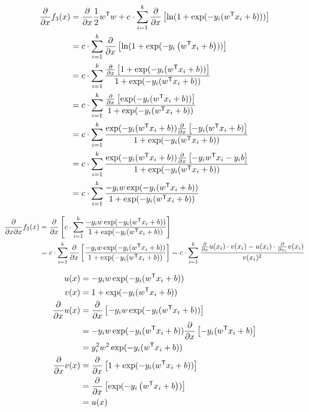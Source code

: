 \documentclass[12pt,landscape]{article}
\newcommand{\tr}{^\mathsf{T}}
\begin{document}
\begin{align*}
\frac{\partial}{\partial x} f_3(x) &= \frac{\partial}{\partial x} \frac{1}{2} w\tr w +c \cdot \sum\limits_{i=1}^k \frac{\partial}{\partial x} \left[ \ln(\zLog)\right]\\
&= c \cdot \sum\limits_{i=1}^k \frac{\partial}{\partial x} \left[ \ln(1+\exp(-y_i\left(w\tr x_i + b \right) ))\right] \\
&= c \cdot \sum\limits_{i=1}^k \frac{\frac{\partial}{\partial x} \left[ 1+\exp(-y_i(w\tr x_i + b)) \right]} {\zLog} \\
&= c \cdot \sum\limits_{i=1}^k \frac{\frac{\partial}{\partial x} \left[ \exp(-y_i(w\tr x_i + b))\right]}{\zLog} \\
&= c \cdot \sum\limits_{i=1}^k \frac{ \exp(-y_i(w\tr x_i + b)) \frac{\partial}{\partial x} \left[ -y_i (w\tr x_i + b)  \right]}{\zLog}\\
&= c \cdot \sum\limits_{i=1}^k \frac{ \exp(-y_i(w\tr x_i + b)) \frac{\partial}{\partial x} \left[ -y_i w\tr x_i -y_i b \right]}{\zLog}\\
&= c \cdot \sum\limits_{i=1}^k \frac{ -y_i w\exp(-y_i(w\tr x_i + b)) }{\zLog}\\
\end{align*}

\newcommand{\dLogz}{-y_i w \exp(-y_i(w\tr x_i + b))}
\newcommand{\dLogn}{\zLog}


\begin{align*}
\frac{\partial}{\partial x \partial x} f_3(x) &= \frac{\partial}{\partial x}\left[ c \cdot \sum\limits_{i=1}^k \frac{\dLogz}{\dLogn}  \right] \\
&= c \cdot \sum\limits_{i=1}^k \frac{\partial}{\partial x} \left[  \frac{\dLogz}{\dLogn}  \right] = c \cdot \sum\limits_{i=1}^k \frac{ \frac{\partial}{\partial x} u(x_i) \cdot v(x_i) - u(x_i) \cdot \frac{\partial}{\partial x_i} v(x_i)} {v(x_i)^2}\\
\end{align*}

\begin{align*}
u(x) &= \dLogz\\
v(x) &= \dLogn\\
\frac{\partial}{\partial x} u(x) &= \frac{\partial}{\partial x} \left[\dLogz \right]\\
 &= -y_i w \exp(-y_i(w\tr x_i + b)) \frac{\partial}{\partial x} \left[ -y_i(w\tr x_i + b) \right] \\
&= y_i^2 w^2 \exp(-y_i(w\tr x_i + b)) \\  
\frac{\partial}{\partial x}  v(x) &= \frac{\partial}{\partial x} \left[  \dLogn \right] \\ 
&= \frac{\partial}{\partial x} \left[\exp(-y_i\left(w\tr x_i + b \right)) \right] \\ 
&= u(x)
\end{align*}
\end{document}
